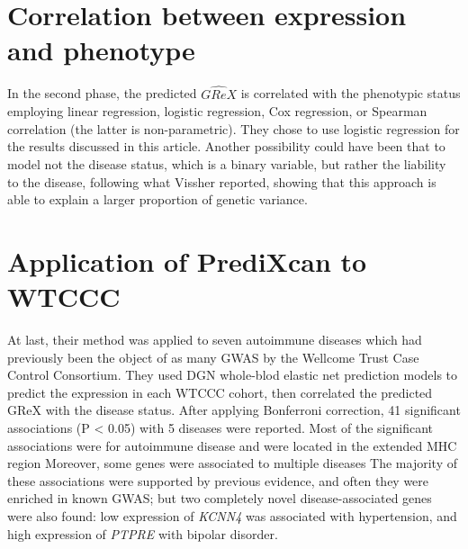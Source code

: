 \documentclass[../main.tex]{subfiles}
\begin{document}
\section{Correlation between expression and phenotype}

In the second phase, the predicted $\widehat{GReX}$ is correlated with 
the phenotypic status employing linear regression, logistic regression, 
Cox regression, or Spearman correlation (the latter is non-parametric). 
They chose to use logistic regression for the results discussed in this 
article. Another possibility could have been that to model not the 
disease status, which is a binary variable, but rather the liability to 
the disease, following what Vissher\autocite{Visscher2008} reported, showing 
that this approach is able to explain a larger proportion of genetic 
variance.

\section{Application of PrediXcan to WTCCC}

At last, their method was applied to seven autoimmune diseases which had 
previously been the object of as many GWAS by the Wellcome Trust Case 
Control Consortium. They used DGN whole-blod elastic net prediction 
models to predict the expression in each WTCCC cohort, then correlated 
the predicted GReX with the disease status. After applying Bonferroni 
correction, 41 significant associations (P < 0.05) with 5 diseases were 
reported. Most of the significant associations were for autoimmune 
disease and were located in the extended MHC 
region 
Moreover, some genes were associated to multiple diseases The majority of these 
associations were supported by previous evidence, and often they were 
enriched in known GWAS; but two completely novel disease-associated 
genes were also found: low expression of \textit{KCNN4} was associated 
with hypertension, and high expression of \textit{PTPRE} with bipolar 
disorder.
\end{document}
